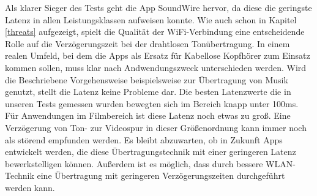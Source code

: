 Als klarer Sieger des Tests geht die App SoundWire hervor, da diese die geringste Latenz in allen Leistungsklassen aufweisen konnte. Wie auch schon in Kapitel \ref{threats} aufgezeigt, spielt die Qualität der WiFi-Verbindung eine entscheidende Rolle auf die Verzögerungszeit bei der drahtlosen Tonübertragung. In einem realen Umfeld, bei dem die Apps als Ersatz für Kabellose Kopfhörer zum Einsatz kommen sollen, muss klar nach Andwendungszweck unterschieden werden. Wird die Beschriebene Vorgehensweise beispielsweise zur Übertragung von Musik genutzt, stellt die Latenz keine Probleme dar. Die besten Latenzwerte die in unseren Tests gemessen wurden bewegten sich im Bereich knapp unter 100ms. Für Anwendungen im Filmbereich ist diese Latenz noch etwas zu groß. Eine Verzögerung von Ton- zur Videospur in dieser Größenordnung kann immer noch als störend empfunden werden. Es bleibt abzuwarten, ob in Zukunft Apps entwickelt werden, die diese Übertragungstechnik mit einer geringeren Latenz bewerkstelligen können. Außerdem ist es möglich, dass durch bessere WLAN-Technik eine Übertragung mit geringeren Verzögerungszeiten durchgeführt werden kann.